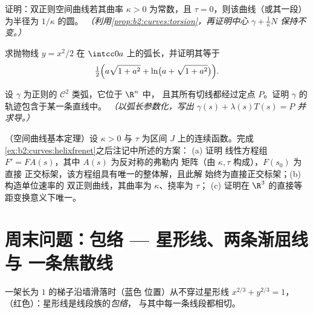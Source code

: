\begin{exercise}[$\star\star\star$]\label{exo:b2:curves:9}
证明：双正则空间曲线若其曲率 $\kappa > 0$ 为常数，且
$\tau = 0$，则该曲线（或其一段）为半径为 $1/\kappa$ 的圆。
\emph{（利用\cref{prop:b2:curves:torsion}，再证明中心
$\gamma + \frac1\kappa N$ 保持不变。）}
\end{exercise}

\begin{exercise}[$\star$]\label{exo:b2:curves:10}
求抛物线 $y = x^2/2$ 在
$\intcc0a$ 上的弧长，并证明其等于
\[
\tfrac12\Bigl(a\sqrt{1 + a^2} + \ln\bigl(a + \sqrt{1 +
a^2}\bigr)\Bigr).
\]
\end{exercise}

\begin{exercise}[$\star\star$]\label{exo:b2:curves:11}
设 $\gamma$ 为正则的 $\mathcal C^2$ 类弧，它位于 $\R^n$ 中，
且其所有切线都经过定点 $P$。证明
$\gamma$ 的轨迹包含于某一条直线中。
\emph{（以弧长参数化，写出 $\gamma(s) +
\lambda(s)T(s) = P$ 并求导。）}
\end{exercise}

\begin{exercise}[$\star\star\star$]\label{exo:b2:curves:12}
（空间曲线基本定理）设 $\kappa > 0$ 与
$\tau$ 为区间 $J$ 上的连续函数。完成
\cref{ex:b2:curves:helixfrenet}之后注记中所述的方案：
(a) 证明
线性方程组 $F' = FA(s)$，其中 $A(s)$ 为反对称的弗勒内
矩阵（由 $\kappa, \tau$ 构成），$F(s_0)$ 为直接
正交标架，该方程组具有唯一的整体解，且此解
始终为直接正交标架；(b) 构造单位速率的
双正则曲线，其曲率为 $\kappa$、挠率为 $\tau$；
(c) 证明在 $\R^3$ 的直接等距变换意义下唯一。
\end{exercise}

\section{周末问题：包络 --- 星形线、两条渐屈线与
一条焦散线}

\begin{omfigure}

{\small 一架长为 $1$ 的梯子沿墙滑落时（蓝色
位置）从不穿过星形线 $x^{2/3} + y^{2/3} = 1$，
（红色）：星形线是线段族的\emph{包络}，
与其中每一条线段都相切。}
\end{omfigure}

